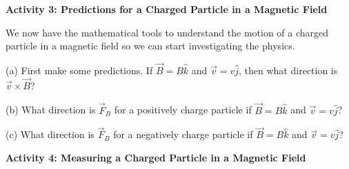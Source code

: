 
\textbf{Activity 3: Predictions for a Charged Particle in a Magnetic Field}

We now have the mathematical tools to understand the motion of a charged
particle in a magnetic field so we can start investigating the physics.

\newpage

(a) First make some predictions.
If $\vec B = B \hat k$ and $\vec v = v \hat j$, then what direction is
$\vec v \times \vec B$?
\vspace{15mm}

(b) What direction is $\vec F_B$ for a positively charge particle 
if $\vec B = B \hat k$ and $\vec v = v \hat j$?
\vspace{15mm}

(c) What direction is $\vec F_B$ for a negatively charge particle
if $\vec B = B \hat k$ and $\vec v = v \hat j$?
\vspace{15mm}

\textbf{Activity 4: Measuring a Charged Particle in a Magnetic Field}

